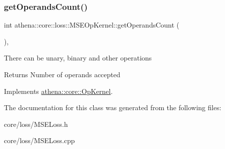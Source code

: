 \mbox{\label{classathena_1_1core_1_1loss_1_1_m_s_e_op_kernel_ab851ee62ea95c3aab8aab2d28cfa9d04}} 
\subsubsection{\texorpdfstring{get\+Operands\+Count()}{getOperandsCount()}}
{\footnotesize\ttfamily int athena\+::core\+::loss\+::\+M\+S\+E\+Op\+Kernel\+::get\+Operands\+Count (\begin{DoxyParamCaption}{ }\end{DoxyParamCaption})\hspace{0.3cm}{\ttfamily [override]}, {\ttfamily [virtual]}}

There can be unary, binary and other operations \begin{DoxyReturn}{Returns}
Number of operands accepted 
\end{DoxyReturn}


Implements \mbox{\hyperlink{classathena_1_1core_1_1_op_kernel_add97d4c132d80ecd9915acfedf7c9119}{athena\+::core\+::\+Op\+Kernel}}.



The documentation for this class was generated from the following files\+:\begin{DoxyCompactItemize}
\item 
core/loss/M\+S\+E\+Loss.\+h\item 
core/loss/M\+S\+E\+Loss.\+cpp\end{DoxyCompactItemize}
